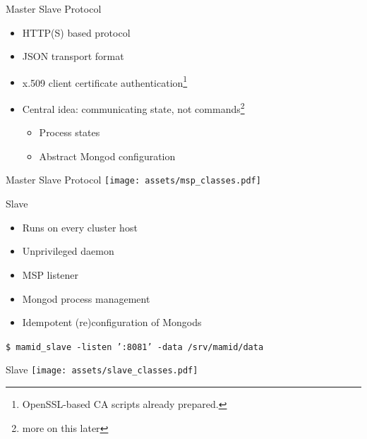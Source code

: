 \documentclass[11pt,aspectratio=169]{beamer}
\begin{document}
    \begin{frame}{Master Slave Protocol}
       \begin{itemize}
           \item HTTP(S) based protocol
           \item JSON transport format
           \item x.509 client certificate authentication\footnote{OpenSSL-based CA scripts already prepared.}
           \item Central idea: communicating state, not commands\footnote{more on this later}
           \begin{itemize}
               \item Process states
               \item Abstract Mongod configuration
            \end{itemize}
        \end{itemize}
        \framebreak
    \end{frame}
    \begin{frame}{Master Slave Protocol}
        \texttt{[image: assets/msp\_classes.pdf]}
    \end{frame}
    

    \begin{frame}{Slave}
        
           \begin{itemize}
               \item Runs on every cluster host
               \item Unprivileged daemon
               \item MSP listener
               \item Mongod process management
               \item Idempotent (re)configuration of Mongods
            \end{itemize}
            \vspace{15pt}
            \texttt{\$ mamid\_slave -listen ':8081' -data /srv/mamid/data}
    \end{frame}
    \begin{frame}{Slave}
        \texttt{[image: assets/slave\_classes.pdf]}
    \end{frame}
    
    
\end{document}
